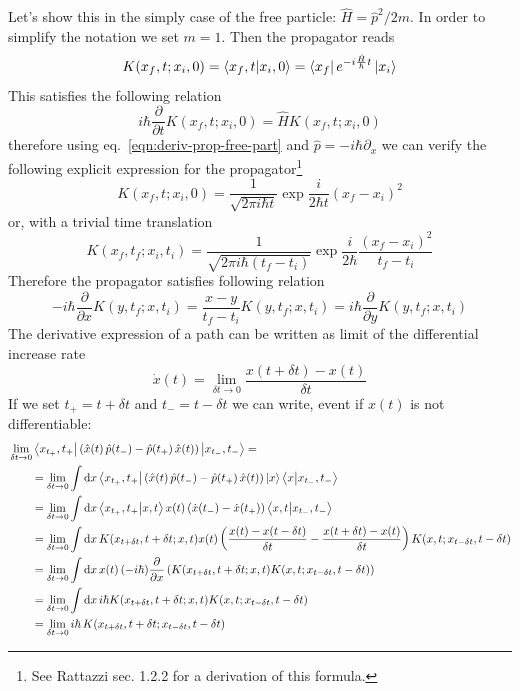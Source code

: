 \documentclass[../main/main.tex]{subfiles}
\begin{document}
Let's show this in the simply case of the free particle: $\hat H=\hat p^2/2m$. In order to simplify the notation we set $m=1$. Then the propagator reads
\[K(x_f,t;x_i,0)=\braket{x_f,t}{x_i,0}=\bra{x_f}e^{-i\frac{\hat H}{\hbar}t}\ket{x_i}\]
This satisfies the following relation
\begin{equation}\label{eqn:deriv-prop-free-part}
i\hbar\frac{\partial}{\partial t}K(x_f,t;x_i,0)=\hat HK(x_f,t;x_i,0)
\end{equation}
therefore using eq.~\eqref{eqn:deriv-prop-free-part} and $\hat p=-i\hbar\partial_x$ we can verify the following explicit expression for the propagator\footnote{See \textsf{Rattazzi sec. 1.2.2} for a derivation of this formula.}
\[K(x_f,t;x_i,0)=\frac1{\sqrt{2\pi i\hbar t}}\exp{\frac{i}{2\hbar t}(x_f-x_i)^2}\]
or, with a trivial time translation
\[K(x_f,t_f;x_i,t_i)=\frac 1{\sqrt{2\pi i\hbar (t_f-t_i)}}\exp{\frac{i}{2\hbar}\frac{(x_f-x_i)^2}{t_f-t_i}}\]
Therefore the propagator satisfies following relation
\begin{equation}\label{eqn:derivx-propag-free-part}
-i\hbar \frac{\partial}{\partial x}K(y,t_f;x,t_i)= \frac{x-y}{t_f-t_i}K(y,t_f;x,t_i)=i\hbar \frac{\partial}{\partial y}K(y,t_f;x,t_i)
\end{equation}
The derivative expression of a path can be written as limit of the differential increase rate
\[\dot x(t)=\lim_{\delta t\to0}\frac{x(t+\delta t)-x(t)}{\delta t}\]
If we set $t_+=t+\delta t$ and $t_-=t-\delta t$ we can write, event if $x(t)$ is not differentiable:
\begin{align*}
&\lim_{\delta t\to0}\bra{x_{t_+},{t_+}}\left(\hat x(t)\,\hat p(t_-)-\hat p(t_+)\,\hat x(t)\right)\ket{x_{t_-},{t_-}}=\\
&\qquad=\lim_{\delta t\to0}\int\textup{d} x\bra{x_{t_+},{t_+}}\left(\hat x(t)\,\hat p(t_-)-\hat p(t_+)\,\hat x(t)\right)\ket x\bra x\ket{x_{t_-},t_-}\\
&\qquad=\lim_{\delta t\to0}\int\textup{d} x\braket{x_{t_+},{t_+}}{x,t}x(t)\left(\dot x(t_-)-\dot x(t_+)\right)\bra{ x,t}\ket{x_{t_-},t_-}\\
&\qquad=\lim_{\delta t\to0}\int\textup{d} x\,K(x_{t+\delta t},t+\delta t;x,t)x(t)\left(\frac{x(t)-x(t-\delta t)}{\delta t}-\frac{x(t+\delta t)-x(t)}{\delta t}\right)K(x,t;x_{t-\delta t},t-\delta t)\\
&\qquad=\lim_{\delta t\to0} \int\textup{d} x\,x(t)\,(-i\hbar)\frac\partial{\partial x}\left(K(x_{t+\delta t},t+\delta t;x,t)K(x,t;x_{t-\delta t},t-\delta t)\right)\\
&\qquad=\lim_{\delta t\to0} \int\textup{d} x\,i\hbar K(x_{t+\delta t},t+\delta t;x,t)K(x,t;x_{t-\delta t},t-\delta t)\\
&\qquad=\lim_{\delta t\to0} i\hbar \,K(x_{t+\delta t},t+\delta t;x_{t-\delta t},t-\delta t)
\end{align*}
\end{document}
